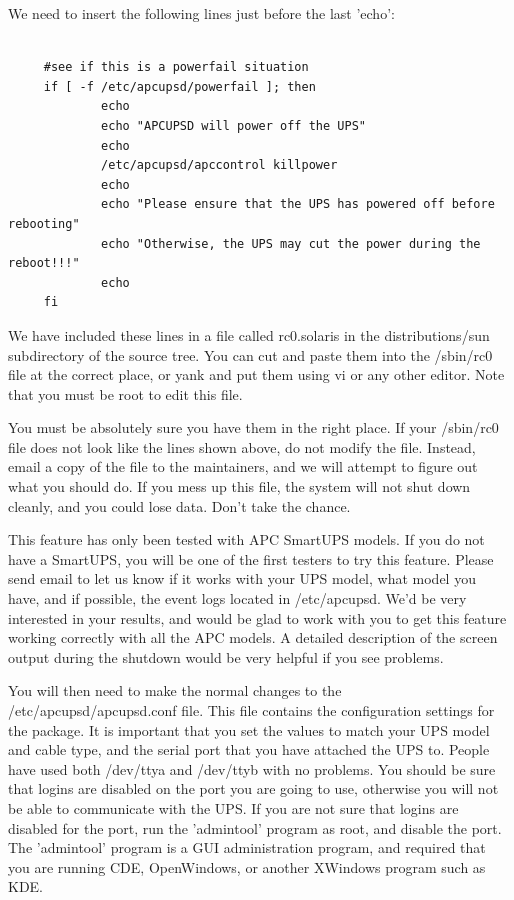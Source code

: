 We need to insert the following lines just before the last 'echo': 

\footnotesize
\begin{verbatim}
     
     #see if this is a powerfail situation
     if [ -f /etc/apcupsd/powerfail ]; then
             echo
             echo "APCUPSD will power off the UPS"
             echo
             /etc/apcupsd/apccontrol killpower
             echo
             echo "Please ensure that the UPS has powered off before rebooting"
             echo "Otherwise, the UPS may cut the power during the reboot!!!"
             echo
     fi
\end{verbatim}
\normalsize

We have included these lines in a file called rc0.solaris in the
distributions/sun subdirectory of the source tree. You can cut and paste them
into the /sbin/rc0 file at the correct place, or yank and put them using vi or
any other editor. Note that you must be root to edit this file.  

You must be absolutely sure you have them in the right place. If your
/sbin/rc0 file does not look like the lines shown above, do not modify the
file. Instead, email a copy of the file to the maintainers, and we will
attempt to figure out what you should do. If you mess up this file, the system
will not shut down cleanly, and you could lose data. Don't take the chance.  

This feature has only been tested with APC SmartUPS models. If you do not have
a SmartUPS, you will be one of the first testers to try this feature. Please
send email to let us know if it works with your UPS model, what model you
have, and if possible, the event logs located in /etc/apcupsd. We'd be very
interested in your results, and would be glad to work with you to get this
feature working correctly with all the APC models. A detailed description of
the screen output during the shutdown would be very helpful if you see
problems.  

You will then need to make the normal changes to the /etc/apcupsd/apcupsd.conf
file. This file contains the configuration settings for the package. It is
important that you set the values to match your UPS model and cable type, and
the serial port that you have attached the UPS to.  People have used both
/dev/ttya and /dev/ttyb with no problems. You should be sure that logins are
disabled on the port you are going to use, otherwise you will not be able to
communicate with the UPS. If you are not sure that logins are disabled for the
port, run the 'admintool' program as root, and disable the port. The
'admintool' program is a GUI administration program, and required that you are
running CDE, OpenWindows, or another XWindows program such as KDE.  

